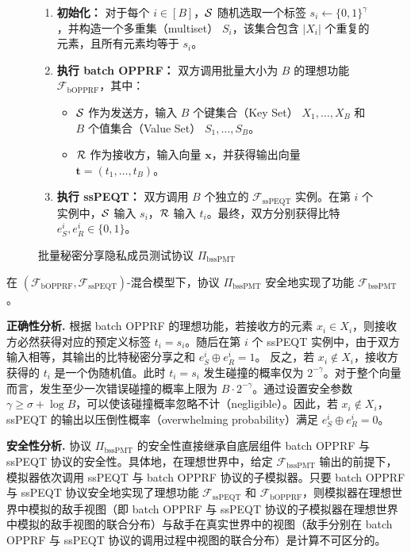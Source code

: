 \begin{figure}[!htb]
\centering
\begin{framed}
\begin{enumerate}
    \item \textbf{初始化：} 对于每个 $i \in [B]$，$\mathcal{S}$ 随机选取一个标签 $s_i \leftarrow \{0,1\}^\gamma$，并构造一个多重集（multiset） $S_i$，该集合包含 $|X_i|$ 个重复的元素，且所有元素均等于 $s_i$。
    \item \textbf{执行 batch OPPRF：} 双方调用批量大小为 $B$ 的理想功能 $\mathcal{F}_{\text{bOPPRF}}$，其中：
    \begin{itemize}[itemsep=2pt,topsep=0pt,parsep=0pt,leftmargin=10pt]
        \item $\mathcal{S}$ 作为发送方，输入 $B$ 个键集合（Key Set） $X_1, \dots, X_B$ 和 $B$ 个值集合（Value Set） $S_1, \dots, S_B$。
        \item $\mathcal{R}$ 作为接收方，输入向量 $\textbf{x}$，并获得输出向量 $\textbf{t} = (t_1, \dots, t_B)$。
    \end{itemize}
    \item \textbf{执行 ssPEQT：} 双方调用 $B$ 个独立的 $\mathcal{F}_{\text{ssPEQT}}$ 实例。在第 $i$ 个实例中，$\mathcal{S}$ 输入 $s_i$，$\mathcal{R}$ 输入 $t_i$。最终，双方分别获得比特 $e_S^i, e_R^i \in \{0,1\}$。
\end{enumerate}
\end{framed}
\caption{批量秘密分享隐私成员测试协议 $\Pi_{\text{bssPMT}}$}\label{fig:proto-bssPMT}
\end{figure}

\begin{theorem} \label{theorem:bssPMT}
在 $(\mathcal{F}_{\text{bOPPRF}}, \mathcal{F}_{\text{ssPEQT}})$-混合模型下，协议 $\Pi_{\text{bssPMT}}$ 安全地实现了功能 $\mathcal{F}_{\text{bssPMT}}$。
\end{theorem}

\begin{trivlist}
\item \textbf{正确性分析.} 根据 batch OPPRF 的理想功能，若接收方的元素 $x_i \in X_i$，则接收方必然获得对应的预定义标签 $t_i = s_i$。随后在第 $i$ 个 ssPEQT 实例中，由于双方输入相等，其输出的比特秘密分享之和 $e_S^i \oplus e_R^i = 1$。
反之，若 $x_i \notin X_i$，接收方获得的 $t_i$ 是一个伪随机值。此时 $t_i = s_i$ 发生碰撞的概率仅为 $2^{-\gamma}$。对于整个向量而言，发生至少一次错误碰撞的概率上限为 $B \cdot 2^{-\gamma}$。通过设置安全参数 $\gamma \ge \sigma + \log B$，可以使该碰撞概率忽略不计（negligible）。因此，若 $x_i \notin X_i$，ssPEQT 的输出以压倒性概率（overwhelming probability）满足 $e_S^i \oplus e_R^i = 0$。

\item \textbf{安全性分析.} 协议 $\Pi_{\text{bssPMT}}$ 的安全性直接继承自底层组件 batch OPPRF 与 ssPEQT 协议的安全性。具体地，在理想世界中，给定 $\mathcal{F}_{\text{bssPMT}}$ 输出的前提下，模拟器依次调用 ssPEQT 与 batch OPPRF 协议的子模拟器。只要 batch OPPRF 与 ssPEQT 协议安全地实现了理想功能 $\mathcal{F}_{\text{ssPEQT}}$ 和 $\mathcal{F}_{\text{bOPPRF}}$，则模拟器在理想世界中模拟的敌手视图（即 batch OPPRF 与 ssPEQT 协议的子模拟器在理想世界中模拟的敌手视图的联合分布）与敌手在真实世界中的视图（敌手分别在 batch OPPRF 与 ssPEQT 协议的调用过程中视图的联合分布）是计算不可区分的。
\end{trivlist}

